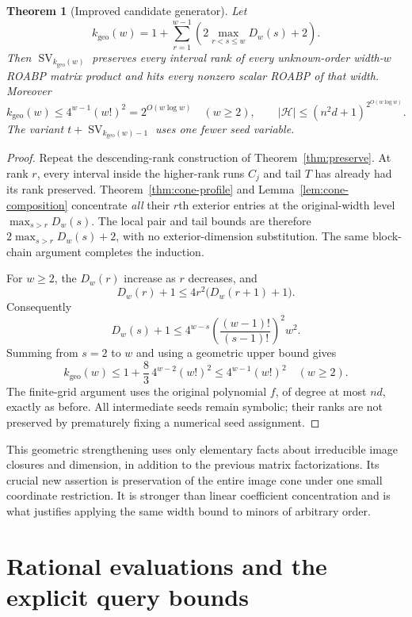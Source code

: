 \documentclass[11pt]{article}
\newtheorem{theorem}{Theorem}[section]
\theoremstyle{definition}\newtheorem{definition}[theorem]{Definition}
\theoremstyle{remark}\newtheorem{remark}[theorem]{Remark}
\newcommand{\SV}{\operatorname{SV}}
\begin{document}
\begin{theorem}[Improved candidate generator]\label{thm:improved}
Let
\[
 k_{\mathrm{geo}}(w)=1+\sum_{r=1}^{w-1}
       \left(2\max_{r<s\le w}D_w(s)+2\right).
\]
Then $\SV_{k_{\mathrm{geo}}(w)}$ preserves every interval rank of every
unknown-order width-$w$ ROABP matrix product and hits every nonzero scalar
ROABP of that width. Moreover
\[
 k_{\mathrm{geo}}(w)\le4^{w-1}(w!)^2=2^{O(w\log w)}\quad(w\ge2),
 \qquad |\mathcal H|\le(n^2d+1)^{2^{O(w\log w)}}.
\]
The variant $t+\SV_{k_{\mathrm{geo}}(w)-1}$ uses one fewer seed variable.
\end{theorem}
\begin{proof}
Repeat the descending-rank construction of Theorem~\ref{thm:preserve}.
At rank $r$, every interval inside the higher-rank runs $C_j$ and tail
$T$ has already had its rank preserved. Theorem~\ref{thm:cone-profile}
and Lemma~\ref{lem:cone-composition} concentrate \emph{all} their
$r$th exterior entries at the original-width level
$\max_{s>r}D_w(s)$. The local pair and tail bounds are therefore
$2\max_{s>r}D_w(s)+2$, with no exterior-dimension substitution.
The same block-chain argument completes the induction.

For $w\ge2$, the $D_w(r)$ increase as $r$ decreases, and
\[
 D_w(r)+1\le4r^2\bigl(D_w(r+1)+1\bigr).
\]
Consequently
\[
 D_w(s)+1\le4^{w-s}\left(\frac{(w-1)!}{(s-1)!}\right)^2w^2.
\]
Summing from $s=2$ to $w$ and using a geometric upper bound gives
\[
 k_{\mathrm{geo}}(w)\le1+\frac83\,4^{w-2}(w!)^2
                  \le4^{w-1}(w!)^2\quad(w\ge2).
\]
The finite-grid argument
uses the original polynomial $f$, of degree at most $nd$, exactly as
before. All intermediate seeds remain symbolic; their ranks are not
preserved by prematurely fixing a numerical seed assignment.
\end{proof}

This geometric strengthening uses only elementary facts about irreducible
image closures and dimension, in addition to the previous matrix
factorizations. Its crucial new assertion is preservation of the entire
image cone under one small coordinate restriction. It is stronger than
linear coefficient concentration and is what justifies applying the same
width bound to minors of arbitrary order.


\section{Rational evaluations and the explicit query bounds}
\label{sec:rational}
\end{document}
